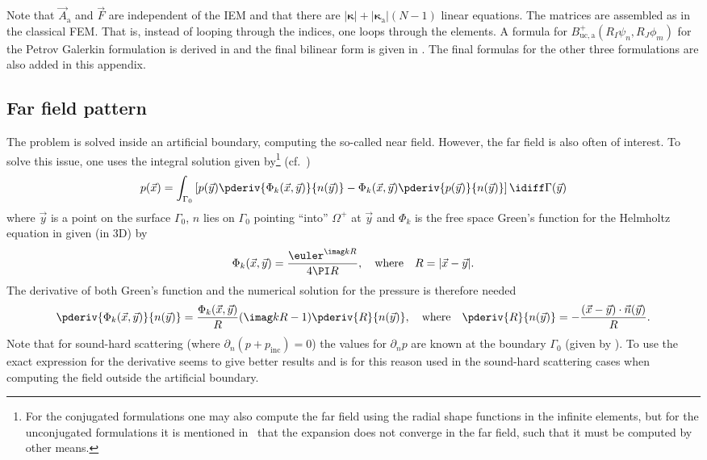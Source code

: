 Note that $\vec{A}_{\mathrm{a}}$ and $\vec{F}$ are independent of the IEM and that there are $|\boldsymbol\kappa| +|\boldsymbol\kappa_{\mathrm{a}}|(N-1)$ linear equations. The matrices are assembled as in the classical FEM. That is, instead of looping through the indices, one loops through the elements. A formula for $B_{\mathrm{uc},\mathrm{a}}^+(R_I\psi_n,R_J\phi_m)$ for the Petrov Galerkin formulation is derived in  and the final bilinear form is given in . The final formulas for the other three formulations are also added in this appendix.

\subsection{Far field pattern}
The problem is solved inside an artificial boundary, computing the so-called near field. However, the far field is also often of interest. To solve this issue, one uses the integral solution given by\footnote{For the conjugated formulations one may also compute the far field using the radial shape functions in the infinite elements, but for the unconjugated formulations it is mentioned in~\cite[p. 137]{Shirron1998aco} that the expansion does not converge in the far field, such that it must be computed by other means.} (cf.~\cite[Theorem 2.21]{Chandler_Wilde2012nab})
\begin{equation}\label{Eq2:KirchhoffIntegral}
	p(\vec{x}) = \int_{\Gamma_0}\left[ p(\vec{y})\pderiv{\Phi_k(\vec{x},\vec{y})}{n(\vec{y})} - \Phi_k(\vec{x},\vec{y})\pderiv{p(\vec{y})}{n(\vec{y})}\right]\idiff \Gamma(\vec{y})
\end{equation}
where $\vec{y}$ is a point on the surface $\Gamma_0$, $n$ lies on $\Gamma_0$ pointing ``into'' $\Omega^+$ at $\vec{y}$ and $\Phi_k$ is the free space Green's function for the Helmholtz equation in  given (in 3D) by
\begin{equation}\label{Eq2:FreeSpaceGrensFunction}
	\Phi_k(\vec{x},\vec{y}) = \frac{\euler^{\imag kR}}{4\PI R},\quad\text{where}\quad R = |\vec{x} - \vec{y}|.
\end{equation}
The derivative of both Green's function and the numerical solution for the pressure is therefore needed
\begin{equation}
	\pderiv{\Phi_k(\vec{x},\vec{y})}{n(\vec{y})} = \frac{\Phi_k(\vec{x},\vec{y})}{R}(\imag kR-1)\pderiv{R}{n(\vec{y})},\quad\text{where}\quad\pderiv{R}{n(\vec{y})} = -\frac{(\vec{x}-\vec{y})\cdot\vec{n}(\vec{y})}{R}.
\end{equation}
Note that for sound-hard scattering (where $\partial_n(p+p_{\mathrm{inc}}) = 0$) the values for $\partial_n p$ are known at the boundary $\Gamma_0$ (given by ). To use the exact expression for the derivative seems to give better results and is for this reason used in the sound-hard scattering cases when computing the field outside the artificial boundary.

